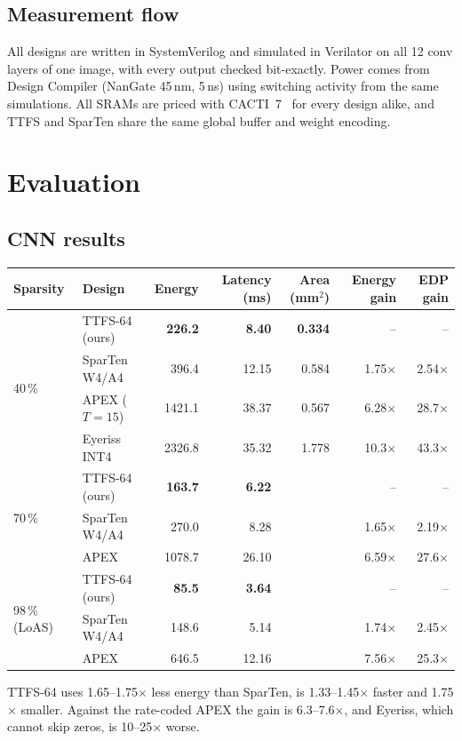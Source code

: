\documentclass[10pt,a4paper]{article}
\begin{document}
\subsection{Measurement flow}
\begin{content}
All designs are written in SystemVerilog and simulated in Verilator on all 12 conv layers of one image, with every
output checked bit-exactly. Power comes from Design Compiler (NanGate 45\,nm, 5\,ns) using switching activity
from the same simulations. All SRAMs are priced with CACTI~7~\cite{cacti} for every design alike, and TTFS and
SparTen share the same global buffer and weight encoding.
\end{content}

\section{Evaluation}
\subsection{CNN results}
\begin{content}
\begin{center}\small
{}\label{tab:cnn}
\setlength{\tabcolsep}{4.5pt}
\begin{tabular}{llrrrrr}
\toprule
Sparsity & Design & Energy & Latency (ms) & Area (mm$^2$) & Energy gain & EDP gain \\
\midrule
\multirow{4}{*}{40\,\%} & TTFS-64 (ours) & \textbf{226.2} & \textbf{8.40} & \textbf{0.334} & -- & -- \\
 & SparTen W4/A4 & 396.4 & 12.15 & 0.584 & 1.75$\times$ & 2.54$\times$ \\
 & APEX ($T{=}15$) & 1421.1 & 38.37 & 0.567 & 6.28$\times$ & 28.7$\times$ \\
 & Eyeriss INT4 & 2326.8 & 35.32 & 1.778 & 10.3$\times$ & 43.3$\times$ \\
\midrule
\multirow{3}{*}{70\,\%} & TTFS-64 (ours) & \textbf{163.7} & \textbf{6.22} & & -- & -- \\
 & SparTen W4/A4 & 270.0 & 8.28 & & 1.65$\times$ & 2.19$\times$ \\
 & APEX & 1078.7 & 26.10 & & 6.59$\times$ & 27.6$\times$ \\
\midrule
\multirow{3}{*}{98\,\% (LoAS)} & TTFS-64 (ours) & \textbf{85.5} & \textbf{3.64} & & -- & -- \\
 & SparTen W4/A4 & 148.6 & 5.14 & & 1.74$\times$ & 2.45$\times$ \\
 & APEX & 646.5 & 12.16 & & 7.56$\times$ & 25.3$\times$ \\
\bottomrule
\end{tabular}
\end{center}
TTFS-64 uses 1.65--1.75$\times$ less energy than SparTen, is 1.33--1.45$\times$ faster and 1.75$\times$ smaller.
Against the rate-coded APEX the gain is 6.3--7.6$\times$, and Eyeriss, which cannot skip zeros, is 10--25$\times$
worse.
\end{content}
\end{document}
